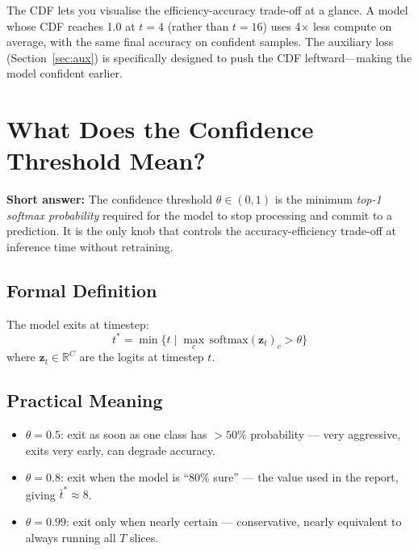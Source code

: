 \documentclass[11pt,a4paper]{article}
\begin{document}
The CDF lets you visualise the efficiency-accuracy trade-off at a glance.
A model whose CDF reaches 1.0 at $t=4$ (rather than $t=16$) uses 4$\times$
less compute on average, with the same final accuracy on confident samples.
The auxiliary loss (Section~\ref{sec:aux}) is specifically designed to push
the CDF leftward---making the model confident earlier.

\section{What Does the Confidence Threshold Mean?}

\begin{answerbox}
\textbf{Short answer:} The confidence threshold $\theta \in (0, 1)$ is the
minimum \emph{top-1 softmax probability} required for the model to stop
processing and commit to a prediction. It is the only knob that controls
the accuracy-efficiency trade-off at inference time without retraining.
\end{answerbox}

\subsection{Formal Definition}

The model exits at timestep:
\[
  t^* = \min\bigl\{t \;\big|\; \max_c \, \text{softmax}(\mathbf{z}_t)_c > \theta\bigr\}
\]
where $\mathbf{z}_t \in \mathbb{R}^C$ are the logits at timestep $t$.

\subsection{Practical Meaning}

\begin{itemize}
  \item $\theta = 0.5$: exit as soon as one class has $>50\%$ probability ---
        very aggressive, exits very early, can degrade accuracy.
  \item $\theta = 0.8$: exit when the model is ``80\% sure'' --- the value
        used in the report, giving $\bar{t}^* \approx 8$.
  \item $\theta = 0.99$: exit only when nearly certain --- conservative,
        nearly equivalent to always running all $T$ slices.
\end{itemize}
\end{document}
